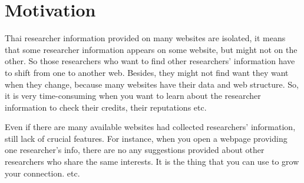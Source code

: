 \section{Motivation}
\label{sec:motivation}

Thai researcher information provided on many websites are isolated, it means that some researcher information appears on some website, but might not on the other. So those researchers who want to find other researchers' information have to shift from one to another web. Besides, they might not find want they want when they change, because many websites have their data and web structure. So, it is very time-consuming when you want to learn about the researcher information to check their credits, their reputations etc.

Even if there are many available websites had collected researchers' information, still lack of crucial features. For instance, when you open a webpage providing one researcher's info, there are no any suggestions provided about other researchers who share the same interests. It is the thing that you can use to grow your connection. etc.